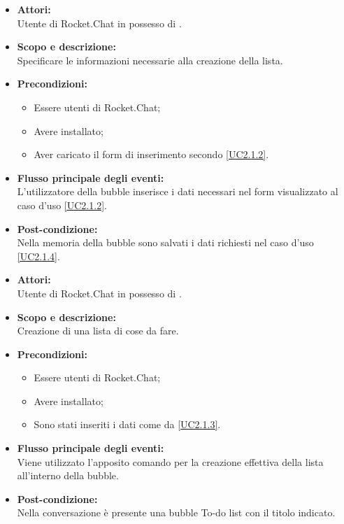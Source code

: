
\begin{itemize}
	\item \textbf{Attori:}
	\\Utente di Rocket.Chat in possesso di \ProjectName{}.
	\item \textbf{Scopo e descrizione:} 
	\\Specificare le informazioni necessarie alla creazione della lista.
	\item \textbf{Precondizioni:}
	\begin{itemize}
		\item Essere utenti di Rocket.Chat;
		\item Avere \ProjectName{} installato;
		\item Aver caricato il form di inserimento secondo \ref{UC2.1.2}.
	\end{itemize}
	\item \textbf{Flusso principale degli eventi:}
	\\L'utilizzatore della bubble inserisce i dati necessari nel form visualizzato al caso d'uso \ref{UC2.1.2}.
	\item \textbf{Post-condizione:}
	\\Nella memoria della bubble sono salvati i dati richiesti nel caso d'uso \ref{UC2.1.4}. 
\end{itemize}


\begin{itemize}
	\item \textbf{Attori:}
	\\Utente di Rocket.Chat in possesso di \ProjectName{}.
	\item \textbf{Scopo e descrizione:} 
	\\Creazione di una lista di cose da fare.
	\item \textbf{Precondizioni:}
	\begin{itemize}
		\item Essere utenti di Rocket.Chat;
		\item Avere \ProjectName{} installato;
		\item Sono stati inseriti i dati come da \ref{UC2.1.3}.
	\end{itemize}
	\item \textbf{Flusso principale degli eventi:}
	\\Viene utilizzato l'apposito comando per la creazione effettiva della lista all'interno della bubble.
	\item \textbf{Post-condizione:}
	\\Nella conversazione è presente una bubble To-do list con il titolo indicato. 
\end{itemize}

